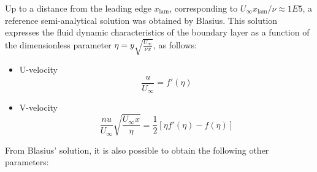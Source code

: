 \documentclass[12pt]{article}
\begin{document}
                Up to a distance from the leading edge \( x_\text{lam} \), corresponding to \( U_\infty x_\text{lam} / \nu \approx 1E5 \), a reference semi-analytical solution was obtained by Blasius. This solution expresses the fluid dynamic characteristics of the boundary layer as a function of the dimensionless parameter $ \eta = y \sqrt{\frac{U_\infty}{\nu x}}$, as follows:

                \begin{itemize}
                        \item U-velocity
                                \begin{equation*}
                                        \frac{u}{U_\infty} = f'(\eta)
                                \end{equation*}
                        \item V-velocity
                                \begin{equation*}
                                        \frac{nu}{U_\infty} \sqrt{\frac{U_\infty x}{\eta}} = \frac{1}{2} \left[ \eta f'(\eta) - f(\eta) \right]
                                \end{equation*}
                \end{itemize}

                From Blasius’ solution, it is also possible to obtain the following other parameters:
\end{document}
